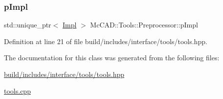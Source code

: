 \subsubsection{\texorpdfstring{p\+Impl}{pImpl}}
{\footnotesize\ttfamily std\+::unique\+\_\+ptr$<$ \hyperlink{classMcCAD_1_1Tools_1_1Preprocessor_1_1Impl}{Impl} $>$ Mc\+C\+A\+D\+::\+Tools\+::\+Preprocessor\+::p\+Impl\hspace{0.3cm}{\ttfamily [private]}}



Definition at line 21 of file build/includes/interface/tools/tools.\+hpp.



The documentation for this class was generated from the following files\+:\begin{DoxyCompactItemize}
\item 
\hyperlink{build_2includes_2interface_2tools_2tools_8hpp}{build/includes/interface/tools/tools.\+hpp}\item 
\hyperlink{tools_8cpp}{tools.\+cpp}\end{DoxyCompactItemize}
